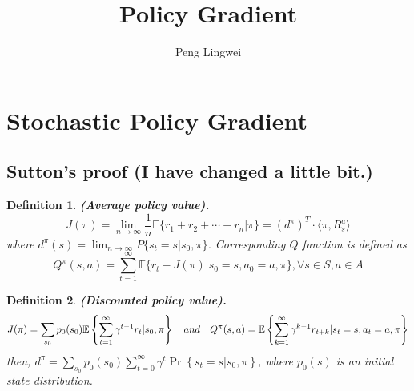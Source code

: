 \documentclass[a4paper]{article}
\title{Policy Gradient}
\author{Peng Lingwei}
\newtheorem{definition}{Definition}
\begin{document}
\maketitle


\tableofcontents
\newpage

\section{Stochastic Policy Gradient~\cite{sutton2000policy}}%
\label{sec:policy_gradient_for_random_policy}

\subsection{Sutton's proof (I have changed a little bit.)}%
\label{sub:sutton_s_proof}

\begin{definition}
    \textbf{(Average policy value).}
    \begin{equation}
        J (\pi) = \lim_{n \to \infty}  \frac{1}{n} \mathbb{E} \{ r_1 + r_2 + \cdots + r_n | \pi \}
        = {(d^\pi)}^T \cdot \langle \pi, R^a_s \rangle
    \end{equation}
    where $ d^\pi(s) = \lim_{n \to \infty} P \{ s_t = s | s_0, \pi \} $.
    Corresponding $ Q $ function is defined as
    \begin{equation}
        Q^{\pi}(s, a) = \sum^{\infty}_{t=1} \mathbb{E} \{ r_t - J(\pi) | s_0 = s, a_0 = a, \pi \},
        \forall s \in S, a \in A
    \end{equation}
\end{definition}

\begin{definition}
    \textbf{(Discounted policy value).}
    \begin{equation}
        J (\pi) = \sum^{}_{s_0} p_0(s_0) \mathbb{E} \left\{ \sum^{\infty}_{t=1} \gamma^{t-1} r_t \arrowvert s_0, \pi \right\}
        \quad and \quad
        Q^\pi(s,a) = \mathbb{E} \left\{ \sum^{\infty}_{k=1} \gamma^{k-1} r_{t+k} \arrowvert s_t = s, a_t = a, \pi \right\}
    \end{equation}
    then, $ d^\pi = \sum^{}_{s_0} p_0(s_0) \sum^{\infty}_{t=0} \gamma^t \Pr \left\{ s_t = s | s_0, \pi \right\} $,
    where $ p_0(s) $ is an initial state distribution.
\end{definition}
\end{document}
